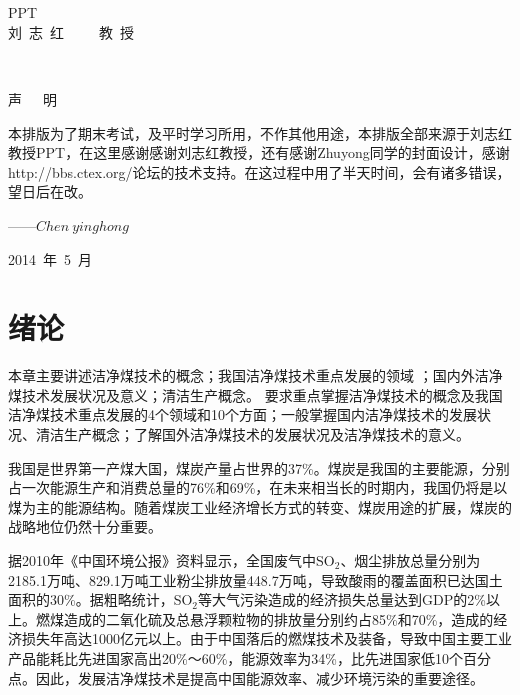 \documentclass[10pt,openany]{ctexbook}
\begin{document}
\begin{titlepage}
\begin{center}
~~~~~~~~~~~~~~~~~~~~~~~~~~~~~~~~~~~~~\\
\vspace{6cm} \\ {PPT } \\ \vspace{3cm}
刘~志~红~~~~~教~授
\thispagestyle{empty}
\end{center}
\end{titlepage}
\thispagestyle{empty}
\newpage
\thispagestyle{empty}
~~\par
\vspace{1.5cm}
{\center \kaishu {}声~~~明\par }
\vspace{0.6cm}

本排版为了期末考试，及平时学习所用，不作其他用途，本排版全部来源于刘志红教授PPT，在这里感谢感谢刘志红教授，还有感谢Zhuyong同学的封面设计，感谢http://bbs.ctex.org/论坛的技术支持。在这过程中用了半天时间，会有诸多错误，望日后在改。\par
\vspace{2.6cm}\hspace{10cm}——{$Chen~yinghong$}\par
\vspace{0.2cm}\hspace{12.2cm}2014~年~5~月
\newpage
~
\thispagestyle{empty}
\newpage
{}
\tableofcontents




\chapter{绪论}
本章主要讲述洁净煤技术的概念；我国洁净煤技术重点发展的领域 ；国内外洁净煤技术发展状况及意义；清洁生产概念。
要求重点掌握洁净煤技术的概念及我国洁净煤技术重点发展的4个领域和10个方面；一般掌握国内洁净煤技术的发展状况、清洁生产概念；了解国外洁净煤技术的发展状况及洁净煤技术的意义。\par
我国是世界第一产煤大国，煤炭产量占世界的37\%。煤炭是我国的主要能源，分别占一次能源生产和消费总量的76\%和69\%，在未来相当长的时期内，我国仍将是以煤为主的能源结构。随着煤炭工业经济增长方式的转变、煤炭用途的扩展，煤炭的战略地位仍然十分重要。\par
据2010年《中国环境公报》资料显示，全国废气中SO$_2$、烟尘排放总量分别为2185.1万吨、829.1万吨工业粉尘排放量448.7万吨，导致酸雨的覆盖面积已达国土面积的30\%。据粗略统计，SO$_2$等大气污染造成的经济损失总量达到GDP的2\%以上。燃煤造成的二氧化硫及总悬浮颗粒物的排放量分别约占85\%和70\%，造成的经济损失年高达1000亿元以上。由于中国落后的燃煤技术及装备，导致中国主要工业产品能耗比先进国家高出20\%～60\%，能源效率为34\%，比先进国家低10个百分点。因此，发展洁净煤技术是提高中国能源效率、减少环境污染的重要途径。
\end{document}
